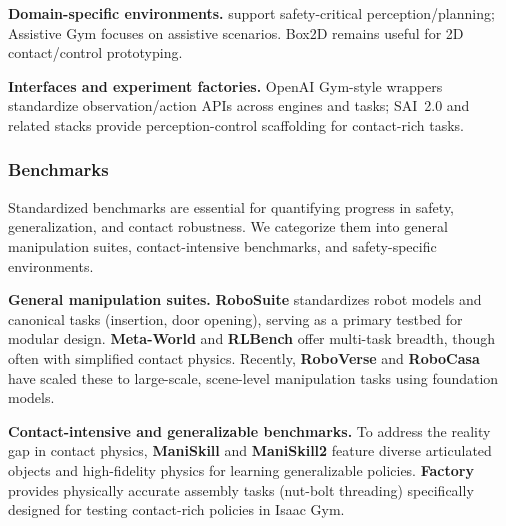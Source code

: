 \documentclass[Afour,sageh,times]{template/sagej}
\begin{document}


\noindent\textbf{Domain-specific environments.}
support safety-critical perception/planning; Assistive Gym \cite{93} focuses on assistive scenarios. Box2D \cite{184} remains useful for 2D contact/control prototyping.

\noindent\textbf{Interfaces and experiment factories.}
OpenAI Gym-style wrappers \cite{263,267} standardize observation/action APIs across engines and tasks; SAI~2.0 \cite{186,288} and related stacks provide perception-control scaffolding for contact-rich tasks.


\subsubsection{Benchmarks}
Standardized benchmarks are essential for quantifying progress in safety, generalization, and contact robustness. We categorize them into general manipulation suites, contact-intensive benchmarks, and safety-specific environments.

\noindent\textbf{General manipulation suites.}
\textbf{RoboSuite} \cite{201} standardizes robot models and canonical tasks (insertion, door opening), serving as a primary testbed for modular design. 
\textbf{Meta-World} \cite{yu2020meta} and \textbf{RLBench} \cite{james2020rlbench} offer multi-task breadth, though often with simplified contact physics.
Recently, \textbf{RoboVerse} \cite{geng2025roboverse} and \textbf{RoboCasa} \cite{nasiriany2024robocasa} have scaled these to large-scale, scene-level manipulation tasks using foundation models.

\noindent\textbf{Contact-intensive and generalizable benchmarks.}
To address the reality gap in contact physics, \textbf{ManiSkill} \cite{mu2maniskill} and \textbf{ManiSkill2} \cite{gumaniskill2} feature diverse articulated objects and high-fidelity physics for learning generalizable policies.
\textbf{Factory} \cite{narang2022factory} provides physically accurate assembly tasks (nut-bolt threading) specifically designed for testing contact-rich policies in Isaac Gym.
\end{document}
